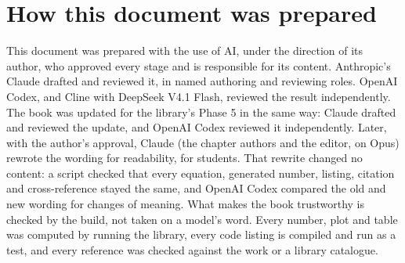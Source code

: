 \section*{How this document was prepared}

This document was prepared with the use of AI, under the direction of its author, who approved every stage and is
responsible for its content. Anthropic's Claude drafted and reviewed it, in named authoring and reviewing roles.
OpenAI Codex, and Cline with DeepSeek V4.1 Flash, reviewed the result independently. The book was updated for the
library's Phase 5 in the same way: Claude drafted and reviewed the update, and OpenAI Codex reviewed it
independently. Later, with the author's approval, Claude (the chapter authors and the editor, on Opus) rewrote the
wording for readability, for students. That rewrite changed no content: a script checked that every equation,
generated number, listing, citation and cross-reference stayed the same, and OpenAI Codex compared the old and new
wording for changes of meaning. What makes the book trustworthy is checked
by the build, not taken on a model's word. Every number, plot and table was computed by running the library, every
code listing is compiled and run as a test, and every reference was checked against the work or a library catalogue.
